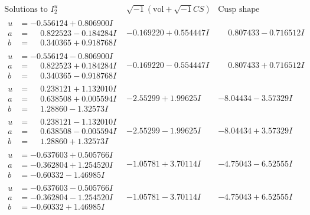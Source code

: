 \documentclass[1p]{elsarticle_modified}
\theoremstyle{definition}
\newcommand{\I}{\sqrt{-1}}
\begin{document}
$$\begin{array}{c|c|c}  
\text{Solutions to }I^u_{2}& \I (\text{vol} + \sqrt{-1}CS) & \text{Cusp shape}\\
 \hline 
\begin{aligned}
u &= -0.556124 + 0.806900 I \\
a &= \phantom{-}0.822523 - 0.184284 I \\
b &= \phantom{-}0.340365 + 0.918768 I\end{aligned}
 & -0.169220 + 0.554447 I & \phantom{-}0.807433 - 0.716512 I \\ \hline\begin{aligned}
u &= -0.556124 - 0.806900 I \\
a &= \phantom{-}0.822523 + 0.184284 I \\
b &= \phantom{-}0.340365 - 0.918768 I\end{aligned}
 & -0.169220 - 0.554447 I & \phantom{-}0.807433 + 0.716512 I \\ \hline\begin{aligned}
u &= \phantom{-}0.238121 + 1.132010 I \\
a &= \phantom{-}0.638508 + 0.005594 I \\
b &= \phantom{-}1.28860 - 1.32573 I\end{aligned}
 & -2.55299 + 1.99625 I & -8.04434 - 3.57329 I \\ \hline\begin{aligned}
u &= \phantom{-}0.238121 - 1.132010 I \\
a &= \phantom{-}0.638508 - 0.005594 I \\
b &= \phantom{-}1.28860 + 1.32573 I\end{aligned}
 & -2.55299 - 1.99625 I & -8.04434 + 3.57329 I \\ \hline\begin{aligned}
u &= -0.637603 + 0.505766 I \\
a &= -0.362804 + 1.254520 I \\
b &= -0.60332 - 1.46985 I\end{aligned}
 & -1.05781 + 3.70114 I & -4.75043 - 6.52555 I \\ \hline\begin{aligned}
u &= -0.637603 - 0.505766 I \\
a &= -0.362804 - 1.254520 I \\
b &= -0.60332 + 1.46985 I\end{aligned}
 & -1.05781 - 3.70114 I & -4.75043 + 6.52555 I \\ \hline\begin{aligned}

\end{aligned}
\end{array}$$
\end{document}
